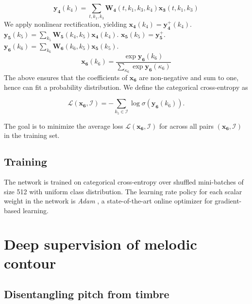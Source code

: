 \documentclass{article}
\begin{document}
\begin{equation}
\boldsymbol{y_4}(k_4) =
\sum_{t,k_1,k_3}
\boldsymbol{W_4}(t, k_1, k_3, k_4)
\boldsymbol{x_3}(t, k_1, k_3)
\end{equation}
We apply nonlinear rectification, yielding $\boldsymbol{x_4}(k_4) = \boldsymbol{y_4^{+}}(k_4)$. $\boldsymbol{y_5}(k_5) = \sum_{k_5} \boldsymbol{W_5}(k_4,k_5) \boldsymbol{x_4}(k_4)$. $\boldsymbol{x_5}(k_5) = \boldsymbol{y_5^{+}}$. $\boldsymbol{y_6}(k_6) = \sum_{k_6} \boldsymbol{W_6}(k_6,k_5) \boldsymbol{x_5}(k_5)$.
\begin{equation}
\boldsymbol{x_6}(k_6) =
\dfrac{\exp \boldsymbol{y_6}(k_6)}
{\sum_{\kappa_6} \exp \boldsymbol{y_6}(\kappa_6)}
\end{equation}
The above ensures that the coefficients of $\boldsymbol{x_6}$ are non-negative and sum to one, hence can fit a probability distribution.
We define the categorical cross-entropy as

\begin{equation}
\mathscr{L}(\boldsymbol{x_6}, \mathcal{I}) =
- \sum_{k_5 \in \mathcal{I}} \log \sigma ( \boldsymbol{y_6}(k_6) ).
\end{equation}

The goal is to minimize the average loss $\mathscr{L}(\boldsymbol{x_6}, \mathcal{I})$ for across all pairs $(\boldsymbol{x_6}, \mathcal{I})$ in the training set.

\subsection{Training}
The network is trained on categorical cross-entropy over shuffled mini-batches of size 512 with uniform class distribution. The learning rate policy for each scalar weight in the network is  \emph{Adam} \cite{Kingma2015}, a state-of-the-art online optimizer for gradient-based learning.


\section{Deep supervision of melodic contour}
\subsection{Disentangling pitch from timbre}
\end{document}
